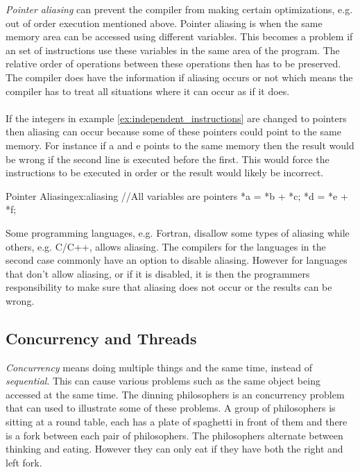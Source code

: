 \documentclass[10pt,a4paper]{report}
\newcounter{example}
\begin{document}
\emph{Pointer aliasing} can prevent the compiler from making certain optimizations, e.g. out of order execution mentioned above. Pointer aliasing is when the same memory area can be accessed using different variables\cite{introduction_hpc_hager}. This becomes a problem if an set of instructions use these variables in the same area of the program. The relative order of operations between these operations then has to be preserved. The compiler does have the information if aliasing occurs or not which means the compiler has to treat all situations where it can occur as if it does\cite{introduction_hpc_hager}.\\
\\
If the integers in example \ref{ex:independent_instructions} are changed to pointers then aliasing can occur because some of these pointers could point to the same memory. For instance if a and e points to the same memory then the result would be wrong if the second line is executed before the first. This would force the instructions to be executed in order or the result would likely be incorrect.

\begin{example}{Pointer Aliasing}{ex:aliasing}
//All variables are pointers
*a = *b + *c;
*d = *e + *f;
\end{example}

Some programming languages, e.g. Fortran, disallow some types of aliasing while others, e.g. C/C++, allows aliasing\cite{introduction_hpc_hager}. The compilers for the languages in the second case commonly have an option to disable aliasing. However for languages that don't allow aliasing, or if it is disabled, it is then the programmers responsibility to make sure that aliasing does not occur or the results can be wrong\cite{introduction_hpc_hager}.

\subsection{Concurrency and Threads}
\label{concurrency}
\emph{Concurrency} means doing multiple things and the same time, instead of \emph{sequential}. This can cause various problems such as the same object being accessed at the same time. The dinning philosophers is an concurrency problem that can used to illustrate some of these problems. A group of philosophers is sitting at a round table, each has a plate of spaghetti in front of them and there is a fork between each pair of philosophers\cite{hoare1985communicating}. The philosophers alternate between thinking and eating. However they can only eat if they have both the right and left fork\cite{hoare1985communicating}.
\end{document}
